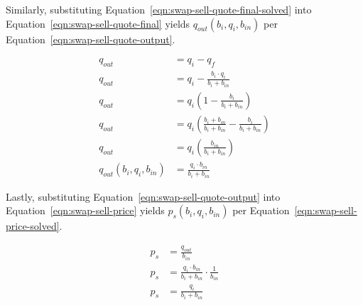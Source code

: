 \documentclass[table, twocolumn]{article}
\begin{document}
Similarly, substituting Equation~\ref{eqn:swap-sell-quote-final-solved} into
Equation~\ref{eqn:swap-sell-quote-final} yields $q_{out}(b_i, q_i, b_{in})$
per Equation~\ref{eqn:swap-sell-quote-output}.

\begin{align}\label{eqn:swap-sell-quote-output}
	q_{out}                    & = q_i - q_f \nonumber                                       \\
	q_{out}                    & = q_i - \frac{b_i \cdot q_i}{b_i + b_{in}} \nonumber        \\
	q_{out}                    & = q_i \left( 1 - \frac{b_i}{b_i + b_{in}} \right) \nonumber \\
	q_{out}                    & = q_i \left(
	\frac{b_i + b_{in}}{b_i + b_{in}} - \frac{b_i}{b_i + b_{in}}
	\right) \nonumber                                                                        \\
	q_{out}                    & = q_i \left( \frac{b_{in}}{b_i + b_{in}} \right) \nonumber  \\
	q_{out} (b_i, q_i, b_{in}) & = \frac{q_i \cdot b_{in}}{b_i + b_{in}}
\end{align}

Lastly, substituting Equation~\ref{eqn:swap-sell-quote-output} into
Equation~\ref{eqn:swap-sell-price} yields $p_s(b_i, q_i, b_{in})$ per
Equation~\ref{eqn:swap-sell-price-solved}.

\begin{align}\label{eqn:swap-sell-price-solved}
	p_s & = \frac{q_{out}}{b_{in}} \nonumber                                       \\
	p_s & = \frac{q_i \cdot b_{in}}{b_i + b_{in}} \cdot \frac{1}{b_{in}} \nonumber \\
	p_s & = \frac{q_i}{b_i + b_{in}}
\end{align}
\end{document}
